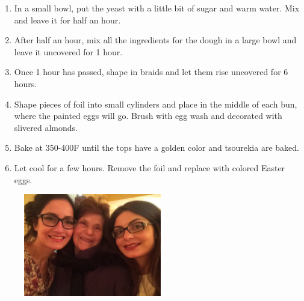 \begin{enumerate}
    \item  In a small bowl, put the yeast with a little bit of sugar and warm water. Mix and leave it for half an hour.
    \item  After half an hour, mix all the ingredients for the dough in a large bowl and leave it uncovered for 1 hour.
    \item  Once 1 hour has passed, shape in braids and let them rise uncovered for 6 hours.
    \item  Shape pieces of foil into small cylinders and place in the middle of each bun, where the painted eggs will go. Brush with egg wash and decorated with slivered almonds.
    \item  Bake at 350-400\degree F until the tops have a golden color and tsourekia are baked.
    \item  Let cool for a few hours. Remove the foil and replace with colored Easter eggs.
\end{enumerate}

\begin{figure}
  \includegraphics[width=60mm]{monanteras/images/Grandma eleni.JPG}
\end{figure}
